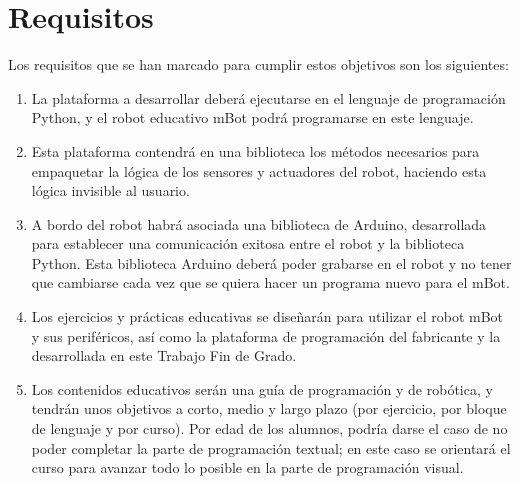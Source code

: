 \section{Requisitos}\label{sec:requisitos}
Los requisitos que se han marcado para cumplir estos objetivos son los siguientes:
\begin{enumerate}
	\item La plataforma a desarrollar deberá ejecutarse en el lenguaje de programación Python, y el robot educativo mBot podrá programarse en este lenguaje.
	\item Esta plataforma contendrá en una biblioteca los métodos necesarios para empaquetar la lógica de los sensores y actuadores del robot, haciendo esta lógica invisible al usuario.
	\item A bordo del robot habrá asociada una biblioteca de Arduino, desarrollada para establecer una comunicación exitosa entre el robot y la biblioteca Python. Esta biblioteca Arduino deberá poder grabarse en el robot y no tener que cambiarse cada vez que se quiera hacer un programa nuevo para el mBot.
	\item Los ejercicios y prácticas educativas se diseñarán para utilizar el robot mBot y sus periféricos, así como la plataforma de programación del fabricante y la desarrollada en este Trabajo Fin de Grado.
	\item Los contenidos educativos serán una guía de programación y de robótica, y tendrán unos objetivos a corto, medio y largo plazo (por ejercicio, por bloque de lenguaje y por curso). Por edad de los alumnos, podría darse el caso de no poder completar la parte de programación textual; en este caso se orientará el curso para avanzar todo lo posible en la parte de programación visual.  
\end{enumerate}

